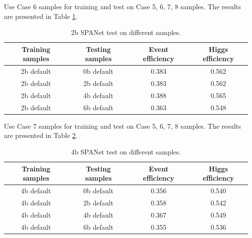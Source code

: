 \documentclass[12pt]{article}
\begin{document}
		Use Case 6 samples for training and test on Case 5, 6, 7, 8 samples. The results are presented in Table \ref{tab:SPANet_1M_2b_default_test_on_different_triHiggs_data}.
		\begin{table}[htpb]
			\centering
			\caption{2b SPANet test on different samples.}
			\label{tab:SPANet_1M_2b_default_test_on_different_triHiggs_data}
			\begin{tabular}{cc|cc}
				Training samples & Testing samples & Event efficiency & Higgs efficiency \\
				\hline 
				2b default      & 0b default     & 0.383        & 0.562    \\
				2b default      & 2b default     & 0.383        & 0.562    \\
				2b default      & 4b default     & 0.388        & 0.565    \\
				2b default      & 6b default     & 0.363        & 0.548    \\
			\end{tabular}
		\end{table}	

		Use Case 7 samples for training and test on Case 5, 6, 7, 8 samples. The results are presented in Table \ref{tab:SPANet_1M_4b_default_test_on_different_triHiggs_data}.
		\begin{table}[htpb]
			\centering
			\caption{4b SPANet test on different samples.}
			\label{tab:SPANet_1M_4b_default_test_on_different_triHiggs_data}
			\begin{tabular}{cc|cc}
				Training samples & Testing samples & Event efficiency & Higgs efficiency \\
				\hline 
				4b default      & 0b default     & 0.356        & 0.540    \\
				4b default      & 2b default     & 0.358        & 0.542    \\
				4b default      & 4b default     & 0.367        & 0.549    \\
				4b default      & 6b default     & 0.355        & 0.536    \\
			\end{tabular}
		\end{table}	
\end{document}
